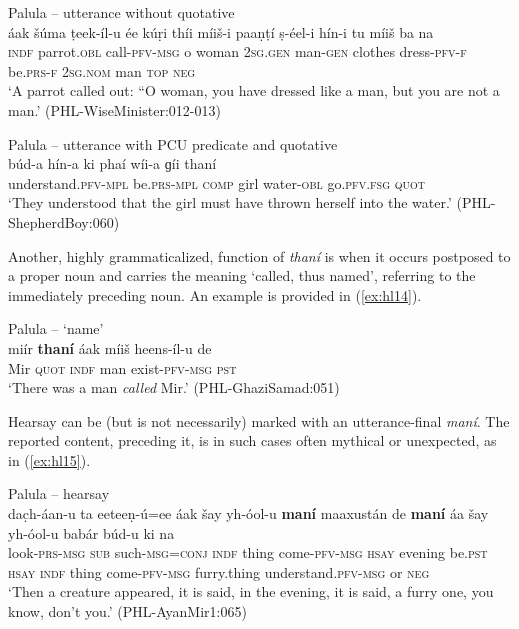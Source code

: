 \documentclass[output=paper]{langsci/langscibook}
\begin{document}
\begin{exe}
	\ex Palula -- utterance without quotative \label{ex:hl12}\\
	\gll áak šúma ṭeek-íl-u ée kúṛi thíi míiš-i paaṇṭí ṣ-éel-i hín-i tu míiš ba na\\
	\textsc{indf} parrot.\textsc{obl} call-\textsc{pfv-msg} o woman \textsc{2sg.gen} man-\textsc{gen} clothes dress-\textsc{pfv-f} be.\textsc{prs-f} 2\textsc{sg.nom} man \textsc{top} \textsc{neg}\\
	\trans ‘A parrot called out: “O woman, you have dressed like a man, but you are not a man.’ (PHL-WiseMinister:012-013)
\end{exe}

\begin{exe}
	\ex Palula -- utterance with PCU predicate and quotative \label{ex:hl13}\\
	\gll búd-a hín-a ki phaí wíi-a ɡíi thaní\\
	understand.\textsc{pfv}-\textsc{mpl}  be.\textsc{prs}-\textsc{mpl} \textsc{comp} girl water-\textsc{obl} go.\textsc{pfv}.\textsc{fsg} \textsc{quot}\\
	\trans ‘They understood that the girl must have thrown herself into the water.’ (PHL-ShepherdBoy:060)
\end{exe}


Another, highly grammaticalized, function of \textit{thaní} is when it occurs postposed to a proper noun and carries the meaning ‘called, thus named’, referring to the immediately preceding noun. An example is provided in ‎(\ref{ex:hl14}).


\begin{exe}
	\ex Palula -- `name' \label{ex:hl14}\\
	\gll miír \textbf{thaní} áak míiš heens-íl-u de\\
	Mir \textsc{quot} \textsc{indf} man exist-\textsc{pfv}-\textsc{msg} \textsc{pst}\\
	\trans ‘There was a man \textit{called} Mir.’ (PHL-GhaziSamad:051)
\end{exe}

Hearsay can be (but is not necessarily) marked with an utterance-final \textit{maní}. The reported content, preceding it, is in such cases often mythical or unexpected, as in ‎(\ref{ex:hl15}).

\begin{exe}
	\ex Palula -- hearsay \label{ex:hl15}\\
	\gll dac̣h-áan-u ta eeteeṇ-ú=ee áak šay yh-óol-u \textbf{maní} maaxustán de \textbf{maní} áa šay yh-óol-u babár búd-u ki na\\
	look-\textsc{prs}-\textsc{msg} \textsc{sub} such-\textsc{msg}=\textsc{conj} \textsc{indf} thing come-\textsc{pfv}-\textsc{msg} \textsc{hsay} evening be.\textsc{pst} \textsc{hsay} \textsc{indf} thing come-\textsc{pfv}-\textsc{msg} furry.thing understand.\textsc{pfv}-\textsc{msg} or \textsc{neg}\\
	\trans ‘Then a creature appeared, it is said, in the evening, it is said, a furry one, you know, don’t you.’ (PHL-AyanMir1:065)
\end{exe}
\end{document}
